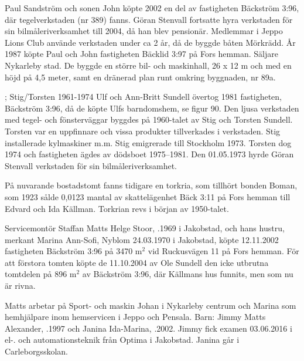 Paul Sandström och sonen John köpte 2002 en del av fastigheten Bäckström 3:96, där tegelverkstaden (nr 389) fanns. Göran Stenvall fortsatte hyra	verkstaden för sin bilmåleriverksamhet till 2004, då han blev pensionär. Medlemmar i Jeppo Lions Club använde verkstaden under ca 2 år, då de 	byggde båten Mörkrädd. År 1987 köpte Paul och John fastigheten Bäcklid 3:97 på Fors hemman. Säljare Nykarleby stad. De byggde en större bil- och maskinhall, 26 x 12 m och med en höjd på 4,5 meter, samt en dränerad plan runt omkring byggnaden, nr 89a.


; Stig/Torsten	1961-1974
Ulf och Ann-Britt Sundell övertog 1981 fastigheten, Bäckström 3:96, då de köpte Ulfs barndomshem, se figur 90. Den ljusa verkstaden med 	tegel- och fönsterväggar byggdes på 1960-talet av Stig och Torsten Sundell. Torsten var en uppfinnare och vissa produkter tillverkades i 	verkstaden. Stig installerade kylmaskiner m.m. Stig emigrerade till Stockholm 1973. Torsten dog 1974 och fastigheten ägdes av dödsboet 1975--1981. Den 01.05.1973 hyrde Göran Stenvall verkstaden för sin 	bilmåleriverksamhet.


På nuvarande bostadstomt fanns tidigare en torkria, som tillhört bonden	Boman, som 1923 sålde 0,0123 mantal av skattelägenhet Bäck 3:11 på 	Fors hemman till Edvard och Ida Källman. Torkrian revs i början av	1950-talet.






Servicemontör Staffan Matts Helge Stoor, .1969 i Jakobstad,	och hans hustru, merkant  Marina Ann-Sofi, \textborn Nyblom 24.03.1970 i Jakobstad, köpte 12.11.2002 fastigheten Bäckström 3:96 på 3470	m$^2$  vid Ruckusvägen 11 på Fors hemman. För att förstora tomten köpte de 11.10.2004 av Ole Sundell den icke utbrutna tomtdelen på 896 m$^2$ av Bäckström 3:96, där Källmans hus funnits, men som nu är rivna.

Matts arbetar på Sport- och maskin Johan i Nykarleby centrum och 	Marina som hemhjälpare inom hemservicen i Jeppo och Pensala.	Barn:	Jimmy Matts Alexander, .1997	och Janina Ida-Marina,	.2002.	Jimmy fick examen 03.06.2016 i el-. och automationsteknik från 	Optima i Jakobstad. Janina går i Carleborgsskolan.


